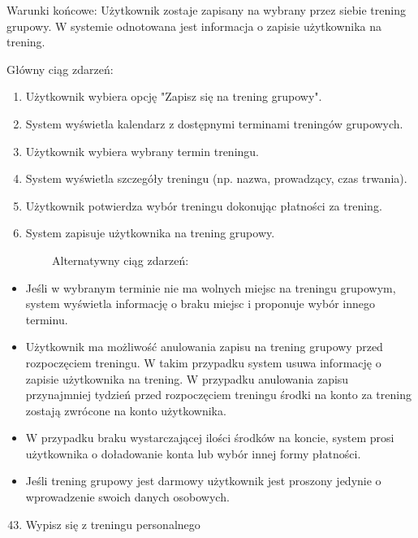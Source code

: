 \documentclass[
]{article}
\providecommand{\tightlist}{%
  \setlength{\itemsep}{0pt}\setlength{\parskip}{0pt}}
\begin{document}
{Warunki końcowe: Użytkownik zostaje zapisany na wybrany przez siebie
trening grupowy. W systemie odnotowana jest informacja o zapisie
użytkownika na trening.}

{Główny ciąg zdarzeń:}

\begin{enumerate}
\tightlist
\item
  {Użytkownik wybiera opcję "Zapisz się na trening grupowy".}
\item
  {System wyświetla kalendarz z dostępnymi terminami treningów
  grupowych.}
\item
  {Użytkownik wybiera wybrany termin treningu.}
\item
  {System wyświetla szczegóły treningu (np. nazwa, prowadzący, czas
  trwania).}
\item
  {Użytkownik potwierdza wybór treningu dokonując płatności za trening.}
\item
  {System zapisuje użytkownika na trening grupowy.}
\end{enumerate}

{~~~~~~~~Alternatywny ciąg zdarzeń:}

\begin{itemize}
\tightlist
\item
  {Jeśli w wybranym terminie nie ma wolnych miejsc na treningu grupowym,
  system wyświetla informację o braku miejsc i proponuje wybór innego
  terminu.}
\item
  {Użytkownik ma możliwość anulowania zapisu na trening grupowy przed
  rozpoczęciem treningu. W takim przypadku system usuwa informację o
  zapisie użytkownika na trening. W przypadku anulowania zapisu
  przynajmniej tydzień przed rozpoczęciem treningu środki na konto za
  trening zostają zwrócone na konto użytkownika.}
\item
  {W przypadku braku wystarczającej ilości środków na koncie, system
  prosi użytkownika o doładowanie konta lub wybór innej formy
  płatności.}
\item
  {Jeśli trening grupowy jest darmowy użytkownik jest proszony jedynie o
  wprowadzenie swoich danych osobowych.\\
  }
\end{itemize}

{}

\begin{enumerate}
\setcounter{enumi}{42}
\tightlist
\item
  {Wypisz się z treningu personalnego}
\end{enumerate}
\end{document}
